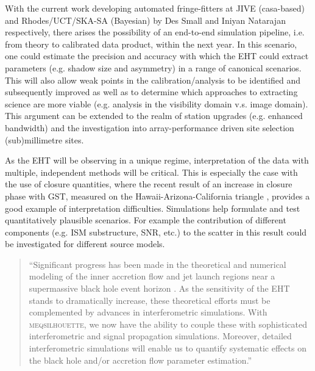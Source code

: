 With the current work developing automated fringe-fitters at JIVE ({\sc casa}-based) and Rhodes/UCT/SKA-SA (Bayesian) by Des Small and Iniyan Natarajan respectively, there arises the possibility of an end-to-end simulation pipeline, i.e. from theory to calibrated data product, within the next year. In this scenario, one could estimate the precision and accuracy with which the EHT could extract parameters (e.g. shadow size and asymmetry) in a range of canonical scenarios. This will also allow weak points in the calibration/analysis to be identified and subsequently improved as well as to determine which approaches to extracting science are more viable (e.g. analysis in the visibility domain v.s. image domain).
This argument can be extended to the realm of station upgrades (e.g. enhanced bandwidth) and the investigation into array-performance driven site selection (sub)millimetre sites. 


As the EHT will be observing in a unique regime, interpretation of the data with multiple, independent methods will be critical. This is especially the case with the use of closure quantities, where the recent result of an increase in closure phase with GST, measured on the Hawaii-Arizona-California triangle \citep{Fish_2016}, provides a good example of interpretation difficulties. Simulations help formulate and test quantitatively plausible scenarios. For example the contribution of different components (e.g. ISM substructure, SNR, etc.) to the scatter in this result could be investigated for different source models. 

\begin{quotation}
``Significant progress has been made in the theoretical and numerical modeling of the inner accretion flow and jet launch regions near a supermassive black hole event horizon
\citep[e.g.][]{Zanna_2007,Etienne_2010,Dexter_2013,Moscibrodzka_2014, McKinney_2014}. As the sensitivity of the EHT stands to dramatically increase, these theoretical efforts must be complemented by advances in interferometric simulations. With \textsc{meqsilhouette}, we now have the ability to couple these with sophisticated interferometric and signal propagation simulations.  Moreover, detailed interferometric simulations will enable us to quantify systematic effects on the black hole and/or accretion flow parameter estimation.''\\
\citep{Blecher_2016}
\end{quotation}



